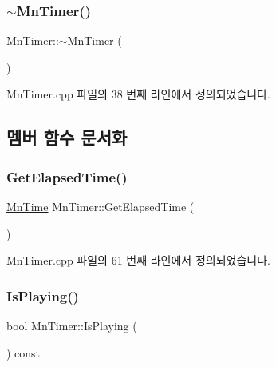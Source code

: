 \subsubsection{\texorpdfstring{$\sim$\+Mn\+Timer()}{~MnTimer()}}
{\footnotesize\ttfamily Mn\+Timer\+::$\sim$\+Mn\+Timer (\begin{DoxyParamCaption}{ }\end{DoxyParamCaption})}



Mn\+Timer.\+cpp 파일의 38 번째 라인에서 정의되었습니다.



\subsection{멤버 함수 문서화}
\mbox{\label{class_m_n_l_1_1_mn_timer_a49d983d8b3dd30a5755b0d83e9d9deff}} 
\subsubsection{\texorpdfstring{Get\+Elapsed\+Time()}{GetElapsedTime()}}
{\footnotesize\ttfamily \hyperlink{class_m_n_l_1_1_mn_time}{Mn\+Time} Mn\+Timer\+::\+Get\+Elapsed\+Time (\begin{DoxyParamCaption}{ }\end{DoxyParamCaption})}



Mn\+Timer.\+cpp 파일의 61 번째 라인에서 정의되었습니다.

\mbox{\label{class_m_n_l_1_1_mn_timer_ab12fb3c3a420e0d9751326c9bcb7d220}} 
\subsubsection{\texorpdfstring{Is\+Playing()}{IsPlaying()}}
{\footnotesize\ttfamily bool Mn\+Timer\+::\+Is\+Playing (\begin{DoxyParamCaption}{ }\end{DoxyParamCaption}) const}



